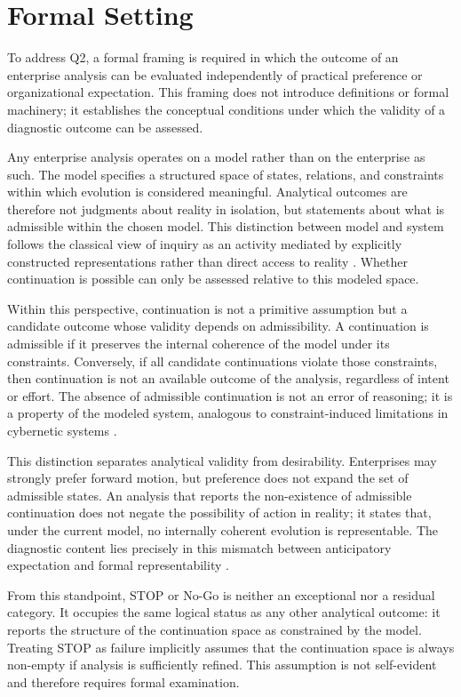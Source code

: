 ﻿\section{Formal Setting}

To address Q2, a formal framing is required in which the outcome of an enterprise analysis can be evaluated independently of practical preference or organizational expectation. This framing does not introduce definitions or formal machinery; it establishes the conceptual conditions under which the validity of a diagnostic outcome can be assessed.

Any enterprise analysis operates on a model rather than on the enterprise as such. The model specifies a structured space of states, relations, and constraints within which evolution is considered meaningful. Analytical outcomes are therefore not judgments about reality in isolation, but statements about what is admissible within the chosen model. This distinction between model and system follows the classical view of inquiry as an activity mediated by explicitly constructed representations rather than direct access to reality \cite{churchman1971}. Whether continuation is possible can only be assessed relative to this modeled space.

Within this perspective, continuation is not a primitive assumption but a candidate outcome whose validity depends on admissibility. A continuation is admissible if it preserves the internal coherence of the model under its constraints. Conversely, if all candidate continuations violate those constraints, then continuation is not an available outcome of the analysis, regardless of intent or effort. The absence of admissible continuation is not an error of reasoning; it is a property of the modeled system, analogous to constraint-induced limitations in cybernetic systems \cite{ashby1956}.

This distinction separates analytical validity from desirability. Enterprises may strongly prefer forward motion, but preference does not expand the set of admissible states. An analysis that reports the non-existence of admissible continuation does not negate the possibility of action in reality; it states that, under the current model, no internally coherent evolution is representable. The diagnostic content lies precisely in this mismatch between anticipatory expectation and formal representability \cite{rosen1985}.

From this standpoint, STOP or No-Go is neither an exceptional nor a residual category. It occupies the same logical status as any other analytical outcome: it reports the structure of the continuation space as constrained by the model. Treating STOP as failure implicitly assumes that the continuation space is always non-empty if analysis is sufficiently refined. This assumption is not self-evident and therefore requires formal examination.

